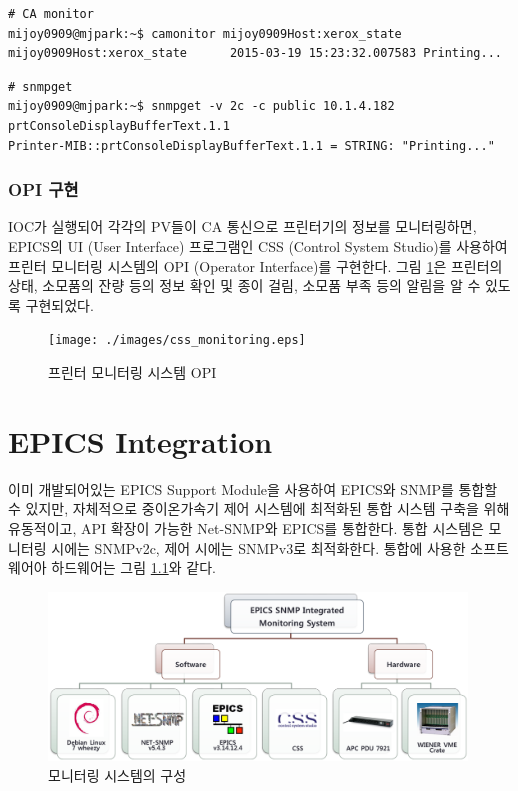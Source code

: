 \documentclass[11pt
  , a4paper
  , article
  , oneside
]{memoir}
\begin{document}
\begin{enumerate}
\begin{lstlisting}[style=termstyle]
# CA monitor
mijoy0909@mjpark:~$ camonitor mijoy0909Host:xerox_state
mijoy0909Host:xerox_state      2015-03-19 15:23:32.007583 Printing...  
\end{lstlisting}

\begin{lstlisting}[style=termstyle]
# snmpget
mijoy0909@mjpark:~$ snmpget -v 2c -c public 10.1.4.182 prtConsoleDisplayBufferText.1.1
Printer-MIB::prtConsoleDisplayBufferText.1.1 = STRING: "Printing..."
\end{lstlisting}

\end{enumerate}

\subsection{OPI 구현}
IOC가 실행되어 각각의 PV들이 CA 통신으로 프린터기의 정보를 모니터링하면, EPICS의 UI (User Interface) 프로그램인 CSS (Control System Studio)를 사용하여 프린터 모니터링 시스템의 OPI (Operator Interface)를 구현한다. 그림 \ref{fig:css_monitoring}은 프린터의 상태, 소모품의 잔량 등의 정보 확인 및 종이 걸림, 소모품 부족 등의 알림을 알 수 있도록 구현되었다.

\begin{figure}[h!]
  \centering
  \texttt{[image: ./images/css\_monitoring.eps]}
  \caption{프린터 모니터링 시스템 OPI}
  \label{fig:css_monitoring}   
\end{figure}

\clearpage

\chapter{EPICS Integration}
이미 개발되어있는 EPICS Support Module을 사용하여 EPICS와 SNMP를 통합할 수 있지만, 자체적으로 중이온가속기 제어 시스템에 최적화된 통합 시스템 구축을 위해 유동적이고, API 확장이 가능한 Net-SNMP와 EPICS를 통합한다. 통합 시스템은 모니터링 시에는 SNMPv2c, 제어 시에는 SNMPv3로 최적화한다. 통합에 사용한 소프트웨어아 하드웨어는 그림 \ref{fig:integ2}와 같다.

\begin{figure}[h!]
  \centering
  \includegraphics[width=0.99\textwidth]{./images/integ.eps}
  \caption{모니터링 시스템의 구성}
  \label{fig:integ2}   
\end{figure}
\end{document}

